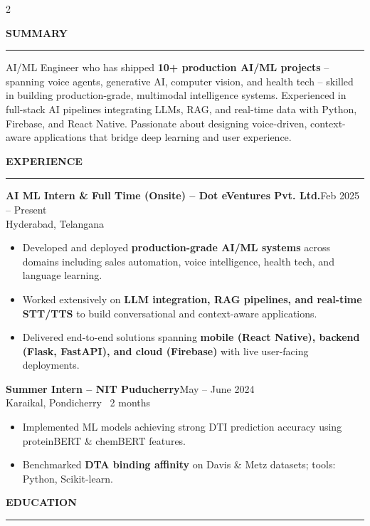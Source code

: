 \documentclass[10pt, a4paper]{article}
\newcommand{\rsection}[1]{%
  \vspace{4pt}%
  {\color{accent}\textbf{\small\MakeUppercase{#1}}}\\[-5pt]%
  {\color{rulecol}\rule{\linewidth}{0.8pt}}%
  \vspace{2.5pt}%
}
\newcommand{\entry}[3]{%
  \noindent
  {\small\textbf{\color{accent}#1}}\hfill{\footnotesize\color{mutedtext}#2}\\[-3pt]%
  {\footnotesize\color{mutedtext}#3}%
  \vspace{1pt}%
}
\begin{document}
\begin{paracol}{2}


\rsection{Summary}
{\small\color{mutedtext}
AI/ML Engineer who has shipped \textbf{10+ production AI/ML projects} -- spanning
voice agents, generative AI, computer vision, and health tech -- skilled in building
production-grade, multimodal intelligence systems. Experienced in full-stack AI
pipelines integrating LLMs, RAG, and real-time data with Python, Firebase, and React
Native. Passionate about designing voice-driven, context-aware applications that
bridge deep learning and user experience.
}

\rsection{Experience}

\entry{AI ML Intern \& Full Time (Onsite) -- Dot eVentures Pvt. Ltd.}{Feb 2025 -- Present}{Hyderabad, Telangana}
\begin{itemize}
  \item Developed and deployed \textbf{production-grade AI/ML systems} across domains including sales automation, voice intelligence, health tech, and language learning.
  \item Worked extensively on \textbf{LLM integration, RAG pipelines, and real-time STT/TTS} to build conversational and context-aware applications.
  \item Delivered end-to-end solutions spanning \textbf{mobile (React Native), backend (Flask, FastAPI), and cloud (Firebase)} with live user-facing deployments.
\end{itemize}

\vspace{5pt}
\entry{Summer Intern -- NIT Puducherry}{May -- June 2024}{Karaikal, Pondicherry \textbar\ 2 months}
\begin{itemize}
  \item Implemented ML models achieving strong DTI prediction accuracy using proteinBERT \& chemBERT features.
  \item Benchmarked \textbf{DTA binding affinity} on Davis \& Metz datasets; tools: Python, Scikit-learn.
\end{itemize}

\rsection{Education}


\end{paracol}
\end{document}
